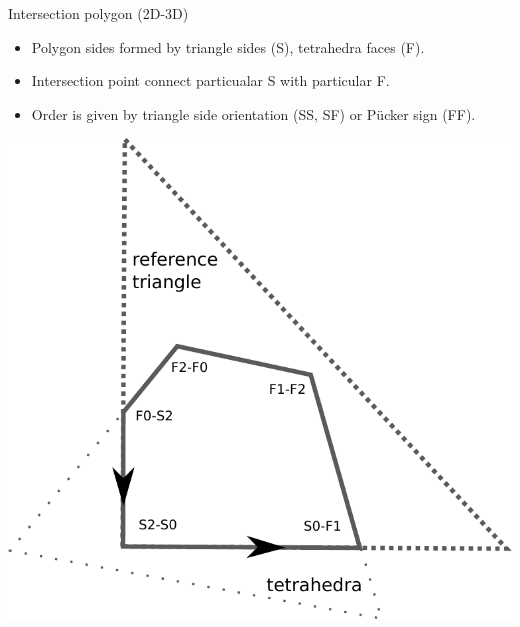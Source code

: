\documentclass[10pt]{beamer} %
\begin{document}
\begin{frame}{Intersection polygon (2D-3D)}
    \begin{itemize}
     \item Polygon sides formed by triangle sides (S), tetrahedra faces (F).
     \item Intersection point connect particualar S with particular F.
     \item Order is given by triangle side orientation (SS, SF) or P\"ucker sign (FF).
    \end{itemize}
    \begin{center}
    \includegraphics[scale=0.4]{graphics/polygon_tracing.pdf} 
    \end{center}   
\end{frame}
\end{document}
